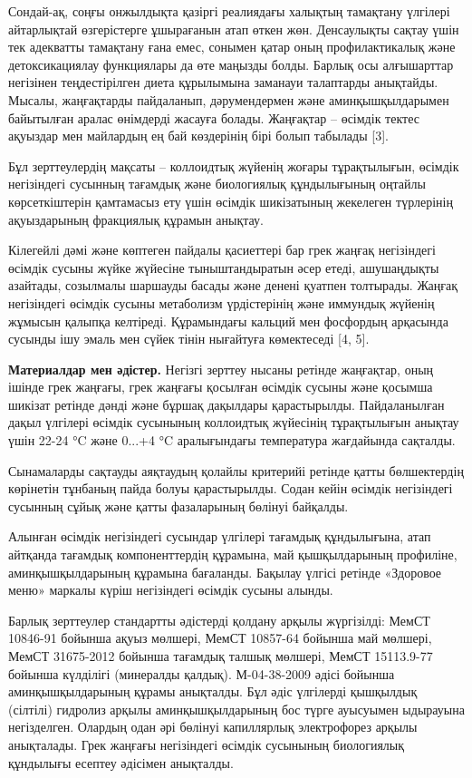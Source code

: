 Сондай-ақ, соңғы онжылдықта қазіргі реалиядағы халықтың тамақтану
үлгілері айтарлықтай өзгерістерге ұшырағанын атап өткен жөн. Денсаулықты
сақтау үшін тек адекватты тамақтану ғана емес, сонымен қатар оның
профилактикалық және детоксикациялау функциялары да өте маңызды болды.
Барлық осы алғышарттар негізінен теңдестірілген диета құрылымына
заманауи талаптарды анықтайды. Мысалы, жаңғақтарды пайдаланып,
дәрумендермен және аминқышқылдарымен байытылған аралас өнімдерді жасауға
болады. Жаңғақтар -- өсімдік тектес ақуыздар мен майлардың ең бай
көздерінің бірі болып табылады {[}3{]}.

Бұл зерттеулердің мақсаты -- коллоидтық жүйенің жоғары тұрақтылығын,
өсімдік негізіндегі сусынның тағамдық және биологиялық құндылығының
оңтайлы көрсеткіштерін қамтамасыз ету үшін өсімдік шикізатының жекелеген
түрлерінің ақуыздарының фракциялық құрамын анықтау.

Кілегейлі дәмі және көптеген пайдалы қасиеттері бар грек жаңғақ
негізіндегі өсімдік сусыны жүйке жүйесіне тыныштандыратын әсер етеді,
ашушаңдықты азайтады, созылмалы шаршауды басады және денені қуатпен
толтырады. Жаңғақ негізіндегі өсімдік сусыны метаболизм үрдістерінің
және иммундық жүйенің жұмысын қалыпқа келтіреді. Құрамындағы кальций мен
фосфордың арқасында сусынды ішу эмаль мен сүйек тінін нығайтуға
көмектеседі {[}4, 5{]}.

{\bfseries Материалдар мен әдістер.} Негізгі зерттеу нысаны ретінде
жаңғақтар, оның ішінде грек жаңғағы, грек жаңғағы қосылған өсімдік
сусыны және қосымша шикізат ретінде дәнді және бұршақ дақылдары
қарастырылды. Пайдаланылған дақыл үлгілері өсімдік сусынының коллоидтық
жүйесінің тұрақтылығын анықтау үшін 22-24 °C және 0...+4 °C аралығындағы
температура жағдайында сақталды.

Сынамаларды сақтауды аяқтаудың қолайлы критерийі ретінде қатты
бөлшектердің көрінетін тұнбаның пайда болуы қарастырылды. Содан кейін
өсімдік негізіндегі сусынның сұйық және қатты фазаларының бөлінуі
байқалды.

Алынған өсімдік негізіндегі сусындар үлгілері тағамдық құндылығына, атап
айтқанда тағамдық компоненттердің құрамына, май қышқылдарының профиліне,
аминқышқылдарының құрамына бағаланды. Бақылау үлгісі ретінде «Здоровое
меню» маркалы күріш негізіндегі өсімдік сусыны алынды.

Барлық зерттеулер стандартты әдістерді қолдану арқылы жүргізілді: МемСТ
10846-91 бойынша ақуыз мөлшері, МемСТ 10857-64 бойынша май мөлшері,
МемСТ 31675-2012 бойынша тағамдық талшық мөлшері, МемСТ 15113.9-77
бойынша күлділігі (минералды қалдық). М-04-38-2009 әдісі бойынша
аминқышқылдарының құрамы анықталды. Бұл әдіс үлгілерді қышқылдық
(сілтілі) гидролиз арқылы аминқышқылдарының бос түрге ауысуымен
ыдырауына негізделген. Олардың одан әрі бөлінуі капиллярлық электрофорез
арқылы анықталады. Грек жаңғағы негізіндегі өсімдік сусынының
биологиялық құндылығы есептеу әдісімен анықталды.

